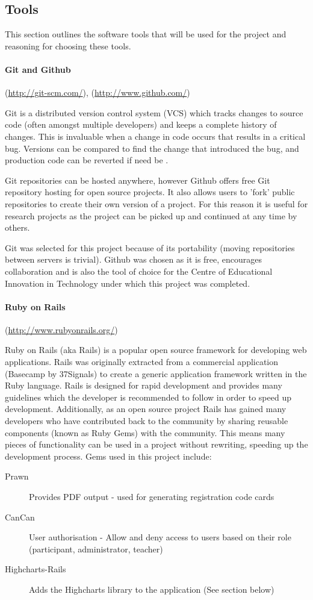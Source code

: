 \subsection{Tools}
This section outlines the software tools that will be used for the project and reasoning for
choosing these tools.
\paragraph{Git and Github}
(\url{http://git-scm.com/}),
(\url{http://www.github.com/})

Git is a distributed version control system (VCS) which tracks changes
to source code (often amongst multiple developers) and keeps a complete history
of changes. This is invaluable when a change in code occurs that results in a critical
bug. Versions can be compared to find the change that introduced the bug, and production
code can be reverted if need be \cite{scott_chacon_pro_2009}.

Git repositories can be hosted anywhere, however Github offers free Git repository hosting
for open source projects. It also allows
users to 'fork' public repositories to create their own version of a project. For this
reason it is useful for research projects as the project can be picked up and continued
at any time by others.

Git was selected for this project because of its portability (moving repositories
between servers is trivial). Github was chosen as it is free, encourages collaboration and is also the tool of choice for the 
Centre of Educational Innovation in Technology \cite{zornig_ceit_2012} under which this project was completed. 

\paragraph{Ruby on Rails}
(\url{http://www.rubyonrails.org/})

Ruby on Rails (aka Rails) is a popular open source framework for developing web applications\cite{bachle_ruby_2007}.
Rails was originally extracted from a commercial application (Basecamp by 37Signals) to create a generic
application framework \cite{carneiro_jr._beginning_2010} written in the Ruby language. Rails is designed for
rapid development and provides many guidelines which the developer is recommended to follow in order to speed up
development. Additionally, as an open source project Rails has gained many developers who have contributed back
to the community by sharing reusable components (known as Ruby Gems) with the community. This means many pieces of
functionality can be used in a project without rewriting, speeding up the development process. Gems used in this
project include:
\begin{description}
\item[Prawn] Provides PDF output - used for generating registration code cards
\item[CanCan] User authorisation - Allow and deny access to users based on their role (participant, administrator, teacher)
\item[Highcharts-Rails] Adds the Highcharts library to the application (See section below)
\end{description}

